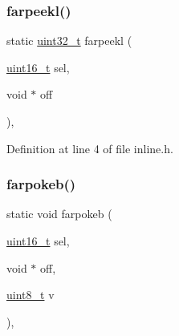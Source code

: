 \subsubsection{\texorpdfstring{farpeekl()}{farpeekl()}}
{\footnotesize\ttfamily static \hyperlink{a00068_a435d1572bf3f880d55459d9805097f62_a435d1572bf3f880d55459d9805097f62}{uint32\+\_\+t} farpeekl (\begin{DoxyParamCaption}\item[{\hyperlink{a00068_a273cf69d639a59973b6019625df33e30_a273cf69d639a59973b6019625df33e30}{uint16\+\_\+t}}]{sel,  }\item[{void $\ast$}]{off }\end{DoxyParamCaption})\hspace{0.3cm}{\ttfamily [inline]}, {\ttfamily [static]}}



Definition at line 4 of file inline.\+h.


\mbox{\label{a00077_a4e7b04b927c6dca2d20f54a5c14a01d6_a4e7b04b927c6dca2d20f54a5c14a01d6}} 
\subsubsection{\texorpdfstring{farpokeb()}{farpokeb()}}
{\footnotesize\ttfamily static void farpokeb (\begin{DoxyParamCaption}\item[{\hyperlink{a00068_a273cf69d639a59973b6019625df33e30_a273cf69d639a59973b6019625df33e30}{uint16\+\_\+t}}]{sel,  }\item[{void $\ast$}]{off,  }\item[{\hyperlink{a00068_aba7bc1797add20fe3efdf37ced1182c5_aba7bc1797add20fe3efdf37ced1182c5}{uint8\+\_\+t}}]{v }\end{DoxyParamCaption})\hspace{0.3cm}{\ttfamily [inline]}, {\ttfamily [static]}}



